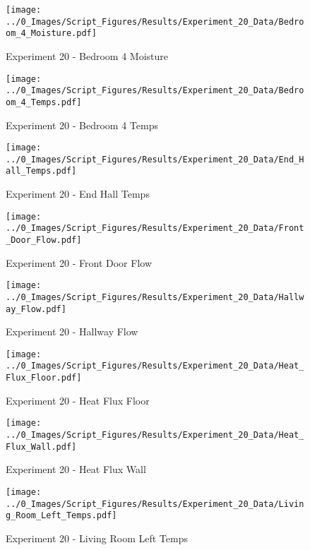 	\clearpage

	\begin{figure}[H]
		\centering
		\texttt{[image: ../0\_Images/Script\_Figures/Results/Experiment\_20\_Data/Bedroom\_4\_Moisture.pdf]}
		\caption[]{Experiment 20 - Bedroom 4 Moisture}
	\end{figure}
 

	\begin{figure}[H]
		\centering
		\texttt{[image: ../0\_Images/Script\_Figures/Results/Experiment\_20\_Data/Bedroom\_4\_Temps.pdf]}
		\caption[]{Experiment 20 - Bedroom 4 Temps}
	\end{figure}
 
	\clearpage

	\begin{figure}[H]
		\centering
		\texttt{[image: ../0\_Images/Script\_Figures/Results/Experiment\_20\_Data/End\_Hall\_Temps.pdf]}
		\caption[]{Experiment 20 - End Hall Temps}
	\end{figure}
 

	\begin{figure}[H]
		\centering
		\texttt{[image: ../0\_Images/Script\_Figures/Results/Experiment\_20\_Data/Front\_Door\_Flow.pdf]}
		\caption[]{Experiment 20 - Front Door Flow}
	\end{figure}
 
	\clearpage

	\begin{figure}[H]
		\centering
		\texttt{[image: ../0\_Images/Script\_Figures/Results/Experiment\_20\_Data/Hallway\_Flow.pdf]}
		\caption[]{Experiment 20 - Hallway Flow}
	\end{figure}
 

	\begin{figure}[H]
		\centering
		\texttt{[image: ../0\_Images/Script\_Figures/Results/Experiment\_20\_Data/Heat\_Flux\_Floor.pdf]}
		\caption[]{Experiment 20 - Heat Flux Floor}
	\end{figure}
 
	\clearpage

	\begin{figure}[H]
		\centering
		\texttt{[image: ../0\_Images/Script\_Figures/Results/Experiment\_20\_Data/Heat\_Flux\_Wall.pdf]}
		\caption[]{Experiment 20 - Heat Flux Wall}
	\end{figure}
 

	\begin{figure}[H]
		\centering
		\texttt{[image: ../0\_Images/Script\_Figures/Results/Experiment\_20\_Data/Living\_Room\_Left\_Temps.pdf]}
		\caption[]{Experiment 20 - Living Room Left Temps}
	\end{figure}
 
